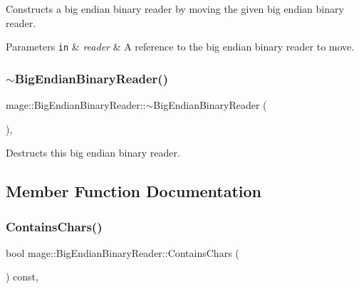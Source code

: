 Constructs a big endian binary reader by moving the given big endian binary reader.


\begin{DoxyParams}[1]{Parameters}
\mbox{\tt in}  & {\em reader} & A reference to the big endian binary reader to move. \\
\hline
\end{DoxyParams}
\hypertarget{classmage_1_1_big_endian_binary_reader_ae85a40e8ed06e8c887e38d914843b8d3}{}\label{classmage_1_1_big_endian_binary_reader_ae85a40e8ed06e8c887e38d914843b8d3} 
\subsubsection{\texorpdfstring{$\sim$\+Big\+Endian\+Binary\+Reader()}{~BigEndianBinaryReader()}}
{\footnotesize\ttfamily mage\+::\+Big\+Endian\+Binary\+Reader\+::$\sim$\+Big\+Endian\+Binary\+Reader (\begin{DoxyParamCaption}{ }\end{DoxyParamCaption})\hspace{0.3cm}{\ttfamily [protected]}, {\ttfamily [default]}}

Destructs this big endian binary reader. 

\subsection{Member Function Documentation}
\hypertarget{classmage_1_1_big_endian_binary_reader_ac6de015b6bbcecdcef58ab074d99fb49}{}\label{classmage_1_1_big_endian_binary_reader_ac6de015b6bbcecdcef58ab074d99fb49} 
\subsubsection{\texorpdfstring{Contains\+Chars()}{ContainsChars()}}
{\footnotesize\ttfamily bool mage\+::\+Big\+Endian\+Binary\+Reader\+::\+Contains\+Chars (\begin{DoxyParamCaption}{ }\end{DoxyParamCaption}) const\hspace{0.3cm}{\ttfamily [protected]}, {\ttfamily [noexcept]}}

